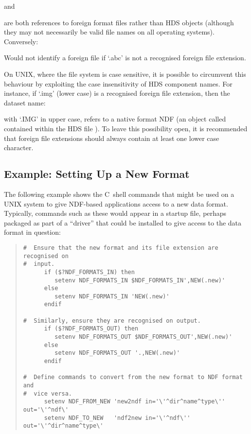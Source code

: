 \begin{quote}
\end{quote}
and
\begin{quote}
\end{quote}

are both references to foreign format files rather than HDS objects
(although they may not necessarily be valid file names on all operating
systems). Conversely:

\begin{quote}
\end{quote}

Would not identify a foreign file if `.abc' is not a recognised
foreign file extension.

On UNIX, where the file system is case sensitive, it is possible to
circumvent this behaviour by exploiting the case insensitivity of HDS
component names. For instance, if `.img' (lower case) is a recognised
foreign file extension, then the dataset name:

\begin{quote}
\end{quote}

with `.IMG' in upper case, refers to a native format NDF (an object
called  contained within the HDS file ).
To leave this possibility open, it is recommended that foreign file
extensions should always contain at least one lower case character.

\subsection{Example: Setting Up a New Format}

The following example shows the C~shell commands that might be used on
a UNIX system to give NDF-based applications access to a new data
format. Typically, commands such as these would appear in a startup
file, perhaps packaged as part of a ``driver'' that could be installed
to give access to the data format in question:

\begin{quote}
\begin{small}
\begin{verbatim}
#  Ensure that the new format and its file extension are recognised on
#  input.
      if ($?NDF_FORMATS_IN) then
         setenv NDF_FORMATS_IN $NDF_FORMATS_IN',NEW(.new)'
      else
         setenv NDF_FORMATS_IN 'NEW(.new)'
      endif

#  Similarly, ensure they are recognised on output.
      if ($?NDF_FORMATS_OUT) then
         setenv NDF_FORMATS_OUT $NDF_FORMATS_OUT',NEW(.new)'
      else
         setenv NDF_FORMATS_OUT '.,NEW(.new)'
      endif

#  Define commands to convert from the new format to NDF format and
#  vice versa.
      setenv NDF_FROM_NEW 'new2ndf in='\'^dir^name^type\'' out='\'^ndf\'
      setenv NDF_TO_NEW   'ndf2new in='\'^ndf\'' out='\'^dir^name^type\'
\end{verbatim}
\end{small}
\end{quote}


